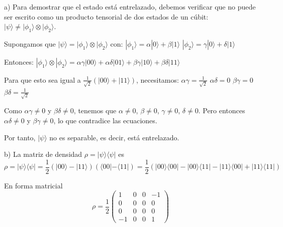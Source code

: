 \begin{questions}

  \begin{solution}
    a) Para demostrar que el estado está entrelazado, debemos verificar que no puede ser escrito como un producto tensorial de dos estados de un cúbit: $|\psi\rangle \neq |\phi_1\rangle \otimes |\phi_2\rangle$.

    Supongamos que $|\psi\rangle = |\phi_1\rangle \otimes |\phi_2\rangle$ con:
    $|\phi_1\rangle = \alpha|0\rangle + \beta|1\rangle$
    $|\phi_2\rangle = \gamma|0\rangle + \delta|1\rangle$

    Entonces:
    $|\phi_1\rangle \otimes |\phi_2\rangle = \alpha\gamma|00\rangle + \alpha\delta|01\rangle + \beta\gamma|10\rangle + \beta\delta|11\rangle$

    Para que esto sea igual a $\frac{1}{\sqrt{2}}(|00\rangle + |11\rangle)$, necesitamos:
    $\alpha\gamma = \frac{1}{\sqrt{2}}$
    $\alpha\delta = 0$
    $\beta\gamma = 0$
    $\beta\delta = \frac{1}{\sqrt{2}}$

    Como $\alpha\gamma \neq 0$ y $\beta\delta \neq 0$, tenemos que $\alpha \neq 0$, $\beta \neq 0$, $\gamma \neq 0$, $\delta \neq 0$.
    Pero entonces $\alpha\delta \neq 0$ y $\beta\gamma \neq 0$, lo que contradice las ecuaciones.

    Por tanto, $|\psi\rangle$ no es separable, es decir, está entrelazado.

    b) La matriz de densidad $\rho = |\psi\rangle\langle\psi|$ es
    \[
      \rho = |\psi\rangle\langle\psi| = \frac{1}{2}(|00\rangle - |11\rangle)(\langle00| - \langle11|)
      = \frac{1}{2}(|00\rangle\langle00| - |00\rangle\langle11| - |11\rangle\langle00| + |11\rangle\langle11|)
    \]

    En forma matricial
    \[
      \rho = \frac{1}{2}\begin{pmatrix}
        1  & 0 & 0 & -1 \\
        0  & 0 & 0 & 0  \\
        0  & 0 & 0 & 0  \\
        -1 & 0 & 0 & 1
      \end{pmatrix}
    \]


\end{solution}
\end{questions}

